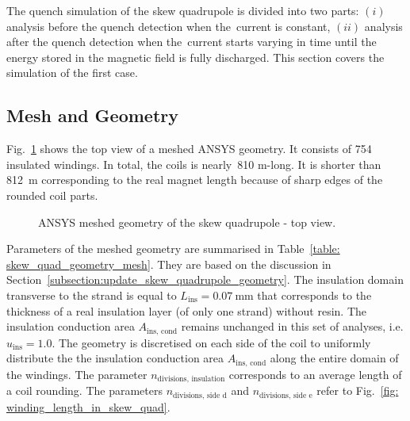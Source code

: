 
The quench simulation of the skew quadrupole is divided into two parts: $(i)$ analysis before the quench detection when the~current is constant, $(ii)$ analysis after the quench detection when the~current starts varying in time until the energy stored in the magnetic field is fully discharged. This section covers the simulation of the first case. 

\subsection{Mesh and Geometry}

Fig.~\ref{fig:skew_quad_ansys_top_view} shows the top view of a meshed ANSYS geometry. It consists of 754 insulated windings. In total, the coils is nearly~810 m-long. It is shorter than 812~m corresponding to the real magnet length because of sharp edges of the rounded coil parts. 

\begin{figure}[H]
    \centering
    \caption{ANSYS meshed geometry of the skew quadrupole - top view.}
    \label{fig:skew_quad_ansys_top_view}
\end{figure}

Parameters of the meshed geometry are summarised in Table~\ref{table: skew_quad_geometry_mesh}. They are based on the discussion in Section~\ref{subsection:update_skew_quadrupole_geometry}. The insulation domain transverse to the strand is equal to $L_\text{ins}=0.07~\text{mm}$ that corresponds to the thickness of a real insulation layer (of only one strand) without resin. The insulation conduction area $A_\text{ins, cond}$ remains unchanged in this set of analyses, i.e. $u_\text{ins}=1.0$. The geometry is discretised on each side of the coil to uniformly distribute the the insulation conduction area $A_\text{ins, cond}$ along the entire domain of the windings. The parameter $n_\text{divisions, insulation}$ corresponds to an average length of a coil rounding. The parameters $n_\text{divisions, side d}$ and $n_\text{divisions, side e}$ refer to Fig.~\ref{fig: winding_length_in_skew_quad}.

